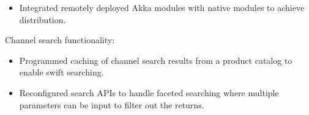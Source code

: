 \begin{cventries}
{\begin{cvitems}
\begin{itemize}
\end{itemize}
\begin{itemize}
\item Integrated remotely deployed Akka modules with native modules to achieve distribution. 
\end{itemize}
        \item {Channel search functionality:}
        \begin{itemize}
\item Programmed caching of channel search results from a product catalog to enable swift searching.
\end{itemize}
\begin{itemize}
\item Reconfigured search APIs to handle faceted searching where multiple parameters can be input to filter out the returns.  
\end{itemize}
             \end{cvitems}
    }
     

\end{cventries}
